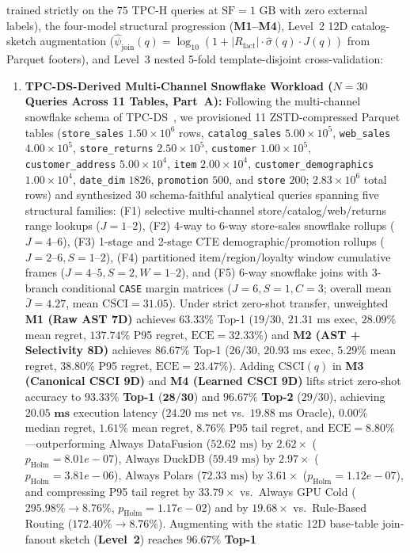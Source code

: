 \documentclass[10pt,a4paper]{article}
\begin{document}
trained strictly on the $75$ TPC-H queries at $\text{SF}=1\text{ GB}$ with zero external labels), the four-model structural progression (\textbf{M1--M4}), Level~2 12D catalog-sketch augmentation ($\hat{\psi}_{\text{join}}(q) = \log_{10}(1 + |R_{\text{fact}}|\cdot\hat{\sigma}(q)\cdot J(q))$ from Parquet footers), and Level~3 nested 5-fold template-disjoint cross-validation:
\begin{enumerate}[leftmargin=1.5em,itemsep=0.8pt]
    \item \textbf{TPC-DS-Derived Multi-Channel Snowflake Workload ($N=30$ Queries Across 11 Tables, Part~A):} Following the multi-channel snowflake schema of TPC-DS~\cite{nambiar2006tpcds}, we provisioned 11 ZSTD-compressed Parquet tables (\texttt{store\_sales} $1.50\times 10^6$ rows, \texttt{catalog\_sales} $5.00\times 10^5$, \texttt{web\_sales} $4.00\times 10^5$, \texttt{store\_returns} $2.50\times 10^5$, \texttt{customer} $1.00\times 10^5$, \texttt{customer\_address} $5.00\times 10^4$, \texttt{item} $2.00\times 10^4$, \texttt{customer\_demographics} $1.00\times 10^4$, \texttt{date\_dim} $1826$, \texttt{promotion} $500$, and \texttt{store} $200$; $2.83\times 10^6$ total rows) and synthesized 30 schema-faithful analytical queries spanning five structural families: (F1) selective multi-channel store/catalog/web/returns range lookups ($J=1\text{--}2$), (F2) 4-way to 6-way store-sales snowflake rollups ($J=4\text{--}6$), (F3) 1-stage and 2-stage CTE demographic/promotion rollups ($J=2\text{--}6, S=1\text{--}2$), (F4) partitioned item/region/loyalty window cumulative frames ($J=4\text{--}5, S=2, W=1\text{--}2$), and (F5) 6-way snowflake joins with 3-branch conditional \texttt{CASE} margin matrices ($J=6, S=1, C=3$; overall mean $\bar{J}=4.27$, mean $\overline{\text{CSCI}}=31.05$). Under strict zero-shot transfer, unweighted \textbf{M1 (Raw AST 7D)} achieves $63.33\%$ Top-1 ($19/30$, $21.31\text{ ms}$ exec, $28.09\%$ mean regret, $137.74\%$ P95 regret, $\text{ECE}=32.33\%$) and \textbf{M2 (AST + Selectivity 8D)} achieves $86.67\%$ Top-1 ($26/30$, $20.93\text{ ms}$ exec, $5.29\%$ mean regret, $38.80\%$ P95 regret, $\text{ECE}=23.47\%$). Adding $\text{CSCI}(q)$ in \textbf{M3 (Canonical CSCI 9D)} and \textbf{M4 (Learned CSCI 9D)} lifts strict zero-shot accuracy to $\mathbf{93.33\%}$ \textbf{Top-1} ($\mathbf{28/30}$) and $\mathbf{96.67\%}$ \textbf{Top-2} ($29/30$), achieving $\mathbf{20.05\text{ ms}}$ execution latency ($24.20\text{ ms}$ net vs.\ $19.88\text{ ms}$ Oracle), $\mathbf{0.00\%}$ median regret, $\mathbf{1.61\%}$ mean regret, $\mathbf{8.76\%}$ P95 tail regret, and $\text{ECE}=\mathbf{8.80\%}$---outperforming Always DataFusion ($52.62\text{ ms}$) by $\mathbf{2.62\times}$ ($p_{\text{Holm}}=8.01e-07$), Always DuckDB ($59.49\text{ ms}$) by $\mathbf{2.97\times}$ ($p_{\text{Holm}}=3.81e-06$), Always Polars ($72.33\text{ ms}$) by $\mathbf{3.61\times}$ ($p_{\text{Holm}}=1.12e-07$), and compressing P95 tail regret by $\mathbf{33.79\times}$ vs.\ Always GPU Cold ($295.98\%\rightarrow 8.76\%$, $p_{\text{Holm}}=1.17e-02$) and by $\mathbf{19.68\times}$ vs.\ Rule-Based Routing ($172.40\%\rightarrow 8.76\%$). Augmenting with the static 12D base-table join-fanout sketch (\textbf{Level~2}) reaches $\mathbf{96.67\%}$ \textbf{Top-1} 
\end{enumerate}
\end{document}

